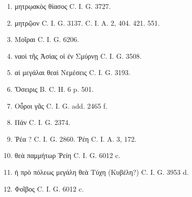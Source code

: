 \documentclass[a4paper, 11pt, oneside, polutonikogreek, german]{article}
\begin{document}
\begin{enumerate}
\item μητρῳακὸς θίασος C. I. G. 3727.

\item μητρῷον C. I. G. 3137. C. I. A. 2, 404. 421. 551.

\item Μοῖραι C. I. G. 6206.

\item ναοὶ τῆς Ἀσίας οἱ ἐν Σμύρνῃ C. I. G. 3508.

\item αἱ μεγάλαι θεαὶ Νεμέσεις C. I. G. 3193.

\item Ὄσειρις B. C. H. 6 p. 501.

\item Οὖροι γᾶς C. I. G. add. 2465 f.

\item Πάν C. I. G. 2374.

\item Ῥέα ? C. I. G. 2860. Ῥέη C. I. A. 3, 172.

\item θεὰ παμμήτωρ Ῥείη C. I. G. 6012 c.

\item ἡ πρὸ πόλεως μεγάλη θεὰ Τύχη (Κυβέλη?) C. I. G. 3953 d.

\item Φοῖβος C. I. G. 6012 c.
\end{enumerate}
\end{document}
